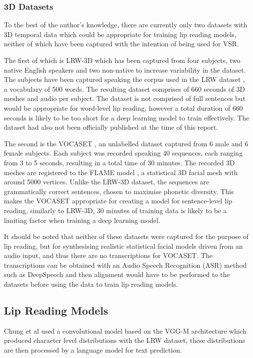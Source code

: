 \documentclass[12pt]{report}
\begin{document}
\subsubsection{3D Datasets} \label{3D Datasets}
To the best of the author's knowledge, there are currently only two datasets with 3D temporal data which could be appropriate for training lip reading models, neither of which have been captured with the intention of being used for VSR.

The first of which is LRW-3D \cite{Tzirakis2019} which has been captured from four subjects, two native English speakers and two non-native to increase variability in the dataset.
The subjects have been captured speaking the corpus used in the LRW dataset \cite{Chung2016}, a vocabulary of 500 words.
The resulting dataset comprises of 660 seconds of 3D meshes and audio per subject.
The dataset is not comprised of full sentences but would be appropriate for word-level lip reading, however a total duration of 660 seconds is likely to be too short for a deep learning model to train effectively.
The dataset had also not been officially published at the time of this report.

The second is the VOCASET \cite{Cudeiro2019}, an unlabelled dataset captured from 6 male and 6 female subjects.
Each subject was recorded speaking 40 sequences, each ranging from 3 to 5 seconds, resulting in a total time of 30 minutes.
The recorded 3D meshes are registered to the FLAME model \cite{Li2017}, a statistical 3D facial mesh with around 5000 vertices.
Unlike the LRW-3D dataset, the sequences are grammatically correct sentences, chosen to maximise phonetic diversity.
This makes the VOCASET appropriate for creating a model for sentence-level lip reading, similarly to LRW-3D, 30 minutes of training data is likely to be a limiting factor when training a deep learning model.

It should be noted that neither of these datasets were captured for the purpose of lip reading, but for synthesising realistic statistical facial models driven from an audio input, and thus there are no transcriptions for VOCASET.
The transcriptions can be obtained with an Audio Speech Recognition (ASR) method such as DeepSpeech \cite{Hannun2014} and then alignment would have to be performed to the datasets before using the data to train lip reading models.

\subsection{Lip Reading Models}
Chung et al \cite{Chung2016} used a convolutional model based on the VGG-M architecture which produced character level distributions with the LRW dataset, these distributions are then processed by a language model for text prediction.
\end{document}
